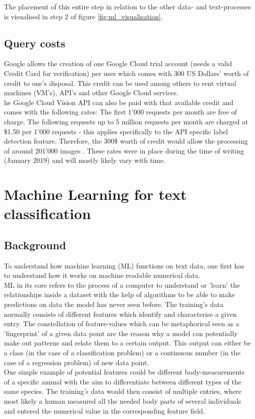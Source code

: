 The placement of this entire step in relation to the other data- and text-processes is visualised in step 2 of figure \ref{fig:ml_visualisation}.

\subsection{Query costs} \label{vision_query_cost}
Google allows the creation of one Google Cloud trial account (needs a valid Credit Card for verification) per user which comes with 300 US Dollars' worth of credit to one's disposal. This credit can be used among others to rent virtual machines (VM's), API's and other Google Cloud services.\\
\newline
he Google Cloud Vision API can also be paid with that available credit and comes with the following rates: The first 1'000 requests per month are free of charge. The following requests up to 5 million requests per month are charged at \$1.50 per 1'000 requests - this applies specifically to the API specific label detection feature. Therefore, the 300\$ worth of credit would allow the processing of around 201'000 images \parencite{GoogleIn.2019}. These rates were in place during the time of writing (January 2019) and will mostly likely vary with time.

\section{Machine Learning for text classification} 
\subsection{Background}
To understand how machine learning (ML) functions on text data, one first has to understand how it works on machine readable numerical data.\\
ML in its core refers to the process of a computer to understand or 'learn' the relationships inside a dataset with the help of algorithms to be able to make predictions on data the model has never seen before. The training's data normally consists of different features which identify and characterise a given entry. The constellation of feature-values which can be metaphorical seen as a 'fingerprint' of a given data point are the reason why a model can potentially make out patterns and relate them to a certain output. This output can either be a class (in the case of a classification problem) or a continuous number (in the case of a regression problem) of new data point.\\
\newline
One simple example of potential features could be different body-measurements of a specific animal with the aim to differentiate between different types of the same species. The training's data would then consist of multiple entries, where most likely a human measured all the needed body parts of several individuals and entered the numerical value in the corresponding feature field.\\


